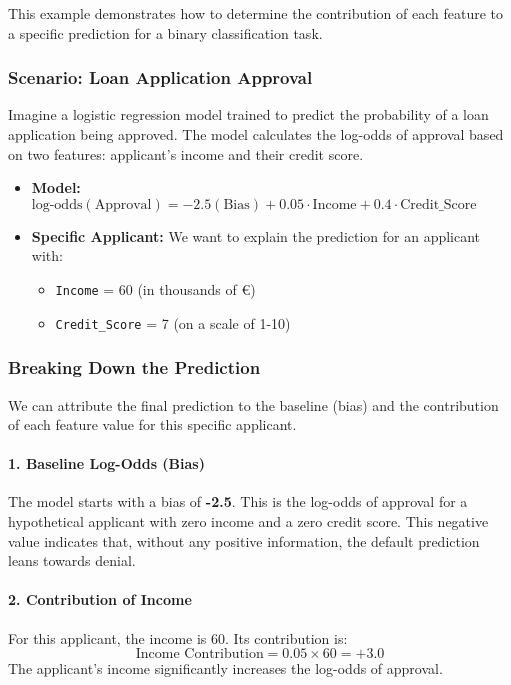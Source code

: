 \documentclass{article}
\begin{document}
\begin{multicols}{2}
This example demonstrates how to determine the contribution of each feature to a specific prediction for a binary classification task.

\subsubsection{Scenario: Loan Application Approval}

Imagine a logistic regression model trained to predict the probability of a loan application being approved. The model calculates the log-odds of approval based on two features: applicant's income and their credit score.

\begin{itemize}
    \item \textbf{Model:} $\text{log-odds}(\text{Approval}) = -2.5 (\text{Bias}) + 0.05 \cdot \text{Income} + 0.4 \cdot \text{Credit\_Score}$
    \item \textbf{Specific Applicant:} We want to explain the prediction for an applicant with:
    \begin{itemize}
        \item \texttt{Income} = 60 (in thousands of €)
        \item \texttt{Credit\_Score} = 7 (on a scale of 1-10)
    \end{itemize}
\end{itemize}

\subsubsection{Breaking Down the Prediction}

We can attribute the final prediction to the baseline (bias) and the contribution of each feature value for this specific applicant.

\paragraph{1. Baseline Log-Odds (Bias)} The model starts with a bias of \textbf{-2.5}. This is the log-odds of approval for a hypothetical applicant with zero income and a zero credit score. This negative value indicates that, without any positive information, the default prediction leans towards denial.

\paragraph{2. Contribution of Income} For this applicant, the income is 60. Its contribution is:
$$ \text{Income Contribution} = 0.05 \times 60 = +3.0 $$
The applicant's income significantly increases the log-odds of approval.


\end{multicols}
\end{document}
